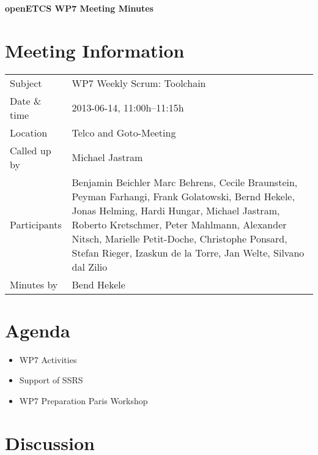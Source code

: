 \documentclass[a4paper, 11pt]{article}
\begin{document}
{\begin{center}\huge\bf openETCS WP7 Meeting Minutes\end{center}}
\section{Meeting Information}

\renewcommand{\arraystretch}{1.5}
\begin{supertabular}{m{.2\textwidth}m{.8\textwidth}}
Subject & WP7 Weekly Scrum: Toolchain\\
Date \& time & 2013-06-14, 11:00h--11:15h\\
Location & Telco and Goto-Meeting\\
Called up by & Michael Jastram\\
Participants &
Benjamin Beichler
Marc Behrens,
Cecile Braunstein,
Peyman Farhangi,
Frank Golatowski,
Bernd Hekele,
Jonas Helming,
Hardi Hungar,
Michael Jastram,
Roberto Kretschmer,
Peter Mahlmann,
Alexander Nitsch,
Marielle Petit-Doche,
Christophe Ponsard,
Stefan Rieger,
Izaskun de la Torre,
Jan Welte,
Silvano dal Zilio\\

Minutes by & Bend Hekele\\

\end{supertabular}
\renewcommand{\arraystretch}{1.0}


\section{Agenda}
\begin{itemize}
\item WP7 Activities
\item Support of SSRS
\item WP7 Preparation Paris Workshop
\end{itemize}

\section{Discussion}
\end{document}
